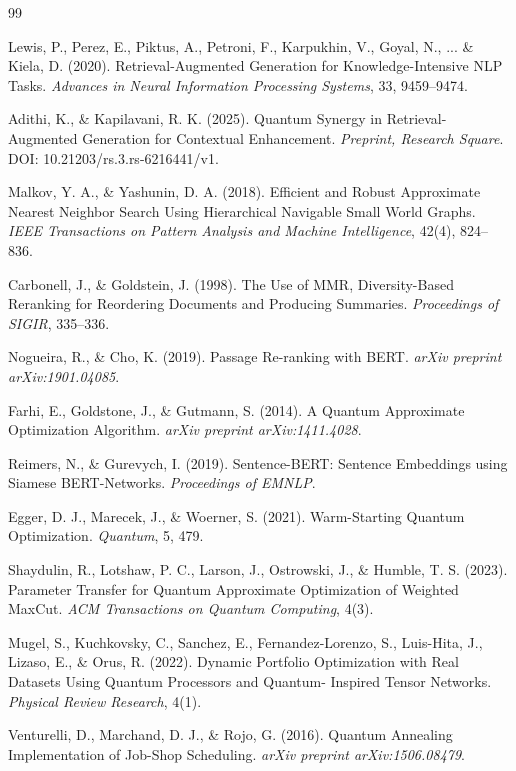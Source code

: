 \documentclass{article}
\begin{document}

\begin{thebibliography}{99}

Lewis, P., Perez, E., Piktus, A., Petroni, F., Karpukhin, V., Goyal,
N., ... \& Kiela, D. (2020). Retrieval-Augmented Generation for
Knowledge-Intensive NLP Tasks. \textit{Advances in Neural Information
Processing Systems}, 33, 9459--9474.

Adithi, K., \& Kapilavani, R. K. (2025).
Quantum Synergy in Retrieval-Augmented Generation for Contextual
Enhancement. \textit{Preprint, Research Square}.
DOI: 10.21203/rs.3.rs-6216441/v1.

Malkov, Y. A., \& Yashunin, D. A. (2018). Efficient and Robust
Approximate Nearest Neighbor Search Using Hierarchical Navigable Small
World Graphs. \textit{IEEE Transactions on Pattern Analysis and Machine
Intelligence}, 42(4), 824--836.

Carbonell, J., \& Goldstein, J. (1998). The Use of MMR,
Diversity-Based Reranking for Reordering Documents and Producing
Summaries. \textit{Proceedings of SIGIR}, 335--336.

Nogueira, R., \& Cho, K. (2019). Passage Re-ranking with BERT.
\textit{arXiv preprint arXiv:1901.04085}.

Farhi, E., Goldstone, J., \& Gutmann, S. (2014). A Quantum Approximate
Optimization Algorithm. \textit{arXiv preprint arXiv:1411.4028}.

Reimers, N., \& Gurevych, I. (2019). Sentence-BERT: Sentence Embeddings
using Siamese BERT-Networks. \textit{Proceedings of EMNLP}.

Egger, D. J., Marecek, J., \& Woerner, S. (2021). Warm-Starting Quantum
Optimization. \textit{Quantum}, 5, 479.

Shaydulin, R., Lotshaw, P. C., Larson, J., Ostrowski, J., \& Humble,
T. S. (2023). Parameter Transfer for Quantum Approximate Optimization
of Weighted MaxCut. \textit{ACM Transactions on Quantum Computing}, 4(3).

Mugel, S., Kuchkovsky, C., Sanchez, E., Fernandez-Lorenzo, S.,
Luis-Hita, J., Lizaso, E., \& Orus, R. (2022). Dynamic Portfolio
Optimization with Real Datasets Using Quantum Processors and Quantum-
Inspired Tensor Networks. \textit{Physical Review Research}, 4(1).

Venturelli, D., Marchand, D. J., \& Rojo, G. (2016). Quantum Annealing
Implementation of Job-Shop Scheduling. \textit{arXiv preprint
arXiv:1506.08479}.

\end{thebibliography}
\end{document}
